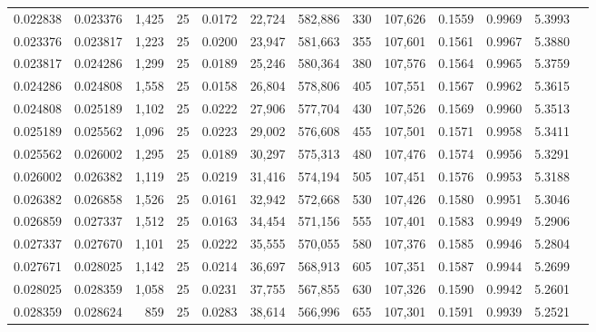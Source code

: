 \begin{tabular}{rrrrrrrrrrrrr}
0.022838 & 0.023376 & 1,425 &  25 &                                     0.0172 &  22,724 & 582,886 &     330 & 107,626 & 0.1559 & 0.9969 & 5.3993 \\
0.023376 & 0.023817 & 1,223 &  25 &                                     0.0200 &  23,947 & 581,663 &     355 & 107,601 & 0.1561 & 0.9967 & 5.3880 \\
0.023817 & 0.024286 & 1,299 &  25 &                                     0.0189 &  25,246 & 580,364 &     380 & 107,576 & 0.1564 & 0.9965 & 5.3759 \\
0.024286 & 0.024808 & 1,558 &  25 &                                     0.0158 &  26,804 & 578,806 &     405 & 107,551 & 0.1567 & 0.9962 & 5.3615 \\
0.024808 & 0.025189 & 1,102 &  25 &                                     0.0222 &  27,906 & 577,704 &     430 & 107,526 & 0.1569 & 0.9960 & 5.3513 \\
0.025189 & 0.025562 & 1,096 &  25 &                                     0.0223 &  29,002 & 576,608 &     455 & 107,501 & 0.1571 & 0.9958 & 5.3411 \\
0.025562 & 0.026002 & 1,295 &  25 &                                     0.0189 &  30,297 & 575,313 &     480 & 107,476 & 0.1574 & 0.9956 & 5.3291 \\
0.026002 & 0.026382 & 1,119 &  25 &                                     0.0219 &  31,416 & 574,194 &     505 & 107,451 & 0.1576 & 0.9953 & 5.3188 \\
0.026382 & 0.026858 & 1,526 &  25 &                                     0.0161 &  32,942 & 572,668 &     530 & 107,426 & 0.1580 & 0.9951 & 5.3046 \\
0.026859 & 0.027337 & 1,512 &  25 &                                     0.0163 &  34,454 & 571,156 &     555 & 107,401 & 0.1583 & 0.9949 & 5.2906 \\
0.027337 & 0.027670 & 1,101 &  25 &                                     0.0222 &  35,555 & 570,055 &     580 & 107,376 & 0.1585 & 0.9946 & 5.2804 \\
0.027671 & 0.028025 & 1,142 &  25 &                                     0.0214 &  36,697 & 568,913 &     605 & 107,351 & 0.1587 & 0.9944 & 5.2699 \\
0.028025 & 0.028359 & 1,058 &  25 &                                     0.0231 &  37,755 & 567,855 &     630 & 107,326 & 0.1590 & 0.9942 & 5.2601 \\
0.028359 & 0.028624 &   859 &  25 &                                     0.0283 &  38,614 & 566,996 &     655 & 107,301 & 0.1591 & 0.9939 & 5.2521 \\

\end{tabular}
